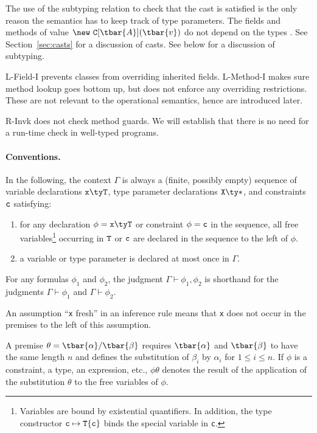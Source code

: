 The use of the subtyping relation to check that the cast is satisfied is the only reason the semantics has to keep track of type parameters. The fields and methods of value $\new~{\tt C}[\tbar{A}](\tbar{v})$ do not depend on the types . See Section~\ref{sec:casts} for a discussion of casts. See below for a discussion of subtyping.

{\sc L-Field-I} prevents classes from overriding inherited fields. {\sc L-Method-I} makes sure method lookup goes bottom up, but does not enforce any overriding restrictions. These are not relevant to the operational semantics, hence are introduced later.

{\sc R-Invk} does not check method guards. We will establish
that there is no need for a run-time check in well-typed programs.

\paragraph{Conventions.}
In the following, the context $\Gamma$ is always a (finite, possibly empty) sequence of variable declarations $\tt x\ty T$, type parameter declarations $\tt X\ty*$, and constraints $\tt c$ satisfying:
\begin{enumerate}
  \item for any declaration $\phi=\tt x\ty T$ or constraint $\phi=\tt c$ in the sequence, all free variables\footnote{Variables are bound by existential quantifiers. In addition, the type constructor ${\tt c}\mapsto{\tt T}\{{\tt c}\}$ binds the special variable {\self} in {\tt c}.} occurring in $\tt T$ or $\tt c$ are declared in the sequence to the left of $\phi$.

  \item a variable or type parameter is declared at most once in $\Gamma$.
\end{enumerate}
For any formulas $\phi_1$ and $\phi_2$, the judgment $\Gamma \vdash \phi_1\comma\phi_2$ is shorthand for the judgments $\Gamma \vdash \phi_1$ and $\Gamma \vdash \phi_2$. 

An assumption ``{\tt x} fresh'' in an inference rule means that {\tt x} does not occur in the premises to the left of this assumption.

A premise $\theta=\tbar{\alpha}/\tbar{\beta}$ requires $\tbar{\alpha}$ and $\tbar{\beta}$ to have the same length $n$ and defines the substitution of $\beta_i$ by $\alpha_i$ for $1\leq i\leq n$. If $\phi$ is a constraint, a type, an expression, etc., $\phi\theta$ denotes the result of the application of the substitution $\theta$ to the free variables of $\phi$.

